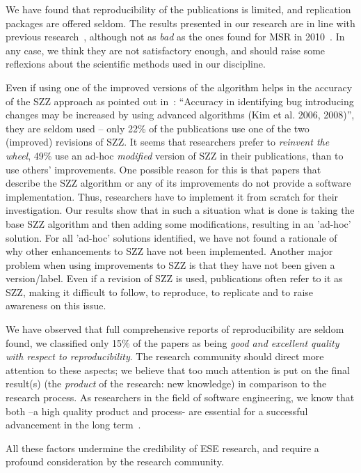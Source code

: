 \documentclass[a4paper, 12pt]{book}
\begin{document}
We have found that reproducibility of the publications is limited, and replication packages are offered seldom. The results presented in our research are in line with previous research~\cite{amann2015software}, although not as \emph{bad} as the ones found for MSR in 2010~\cite{robles2010replicating}. In any case, we think they are not satisfactory enough, and should raise some reflexions about the scientific methods used in our discipline.

Even if using one of the improved versions of the algorithm helps in the accuracy of the SZZ approach as pointed out in~\cite{rahman2012clones}: ``Accuracy in identifying bug introducing changes may be increased by using advanced algorithms (Kim et al. 2006, 2008)'', they are seldom used -- only 22\% of the publications use one of the two (improved) revisions of SZZ. It seems that researchers prefer to \emph{reinvent the wheel}, 49\% use an ad-hoc \emph{modified} version of SZZ in their publications, than to use others' improvements. One possible reason for this is that papers that describe the SZZ algorithm or any of its improvements do not provide a software implementation. Thus, researchers have to implement it from scratch for their investigation. Our results show that in such a situation what is done is taking the base SZZ algorithm and then adding some modifications, resulting in an 'ad-hoc' solution. For all 'ad-hoc' solutions identified, we have not found a rationale of why other enhancements to SZZ have not been implemented. Another major problem when using improvements to SZZ is that they have not been given a version/label. Even if a revision of SZZ is used, publications often refer to it as SZZ, making it difficult to follow, to reproduce, to replicate and to raise awareness on this issue.

We have observed that full comprehensive reports of reproducibility are seldom found, we classified only 15\% of the papers as being \emph{good and excellent quality with respect to reproducibility}. The research community should direct more attention to these aspects; we believe that too much attention is put on the final result(s) (the \emph{product} of the research: new knowledge) in comparison to the research process. As researchers in the field of software engineering, we know that both --a high quality product and process- are essential for a successful advancement in the long term~\cite{kan2002metrics}.

All these factors undermine the credibility of ESE research, and require a profound consideration  by the research community.
\end{document}

